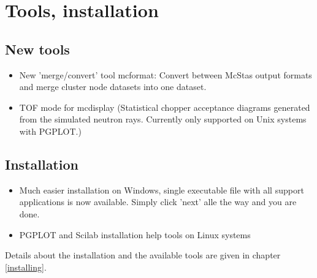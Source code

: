 \section{Tools, installation}
\label{s:new-features:tools}
\subsection{New tools} 
\begin{itemize}
\item New 'merge/convert' tool mcformat: Convert between McStas output formats and merge cluster
    node datasets into one dataset.
\item TOF mode for mcdisplay (Statistical chopper acceptance diagrams generated from the simulated
    neutron rays. Currently only supported on Unix systems with PGPLOT.)
\end{itemize}
\subsection{Installation}
\begin{itemize}
\item Much easier installation on Windows, single executable file with all support applications
    is now available. Simply click 'next' alle the way and you are done.
\item PGPLOT and Scilab installation help tools on Linux systems
\end{itemize}
Details about the installation and the available tools are given in chapter \ref{installing}.

